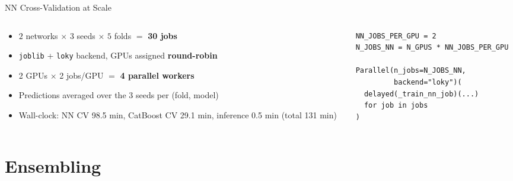 \documentclass[9pt,aspectratio=169]{beamer}
\begin{document}
\begin{frame}[fragile]{NN Cross-Validation at Scale}
  \begin{columns}[T]
    \begin{column}{0.55\textwidth}
      \begin{itemize}
        \item $2$ networks $\times$ $3$ seeds $\times$ $5$ folds $=$ \textbf{30 jobs}
        \item \texttt{joblib} + \texttt{loky} backend, GPUs assigned \textbf{round-robin}
        \item 2 GPUs $\times$ 2 jobs/GPU $=$ \textbf{4 parallel workers}
        \item Predictions averaged over the 3 seeds per (fold, model)
        \item Wall-clock: NN CV 98.5 min, CatBoost CV 29.1 min, inference 0.5 min (total 131 min)
      \end{itemize}
    \end{column}
    \begin{column}{0.45\textwidth}
      \begin{lstlisting}
NN_JOBS_PER_GPU = 2
N_JOBS_NN = N_GPUS * NN_JOBS_PER_GPU

Parallel(n_jobs=N_JOBS_NN,
         backend="loky")(
  delayed(_train_nn_job)(...)
  for job in jobs
)
      \end{lstlisting}
    \end{column}
  \end{columns}
\end{frame}

\section{Ensembling}
\end{document}
